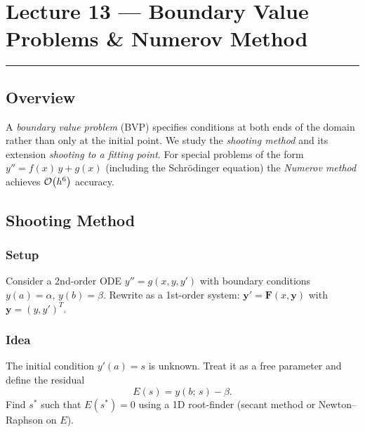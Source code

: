 
\section{Lecture 13 — Boundary Value Problems \& Numerov Method}\label{sec:lec13}
\hrule\vspace{1.5em}

\subsection*{Overview}
A \emph{boundary value problem} (BVP) specifies conditions at both
ends of the domain rather than only at the initial point.  We study
the \emph{shooting method} and its extension
\emph{shooting to a fitting point}.  For special problems of the
form $y'' = f(x)\,y + g(x)$ (including the Schrödinger equation)
the \emph{Numerov method} achieves $\mathcal{O}\!\left(h^6\right)$ accuracy.

\subsection{Shooting Method}\label{subsec:lec13:shooting}

\subsubsection*{Setup}
Consider a 2nd-order ODE $y'' = g(x,y,y')$ with boundary conditions
$y(a)=\alpha$, $y(b)=\beta$.  Rewrite as a 1st-order system:
$\mathbf{y}' = \mathbf{F}(x,\mathbf{y})$ with
$\mathbf{y}=(y,y')^T$.

\subsubsection*{Idea}
The initial condition $y'(a) = s$ is unknown.  Treat it as a free
parameter and define the residual
\begin{equation}
  E(s) = y(b;\,s) - \beta.
  \label{eq:lec13:residual}
\end{equation}
Find $s^*$ such that $E(s^*)=0$ using a 1D root-finder (secant
method or Newton–Raphson on $E$).

